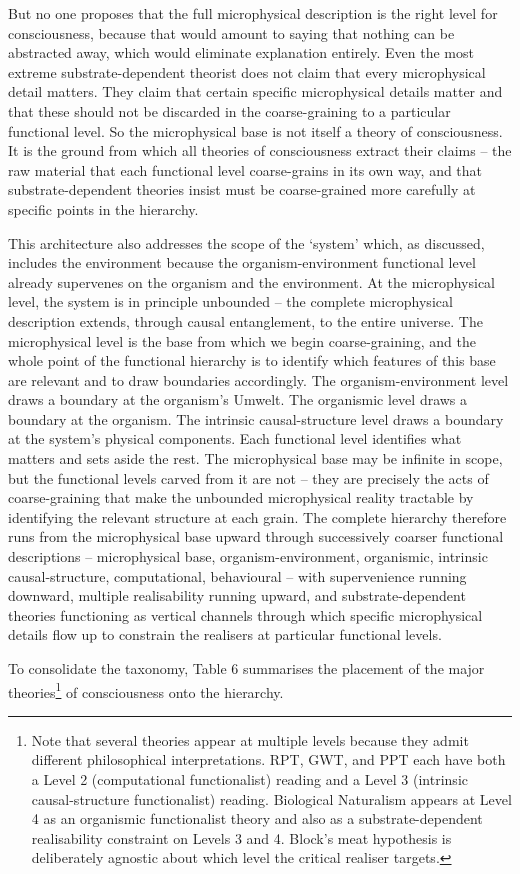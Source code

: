 \documentclass[11pt, a4paper, onecolumn, gdm]{google}
\begin{document}
But no one proposes that the full microphysical description is the right level for consciousness, because that would amount to saying that nothing can be abstracted away, which would eliminate explanation entirely.
Even the most extreme substrate-dependent theorist does not claim that every microphysical detail matters.
They claim that certain specific microphysical details matter and that these should not be discarded in the coarse-graining to a particular functional level.
So the microphysical base is not itself a theory of consciousness.
It is the ground from which all theories of consciousness extract their claims -- the raw material that each functional level coarse-grains in its own way, and that substrate-dependent theories insist must be coarse-grained more carefully at specific points in the hierarchy.

This architecture also addresses the scope of the `system' which, as discussed, includes the environment because the organism-environment functional level already supervenes on the organism and the environment.
At the microphysical level, the system is in principle unbounded -- the complete microphysical description extends, through causal entanglement, to the entire universe.
The microphysical level is the base from which we begin coarse-graining, and the whole point of the functional hierarchy is to identify which features of this base are relevant and to draw boundaries accordingly.
The organism-environment level draws a boundary at the organism's Umwelt.
The organismic level draws a boundary at the organism.
The intrinsic causal-structure level draws a boundary at the system's physical components.
Each functional level identifies what matters and sets aside the rest.
The microphysical base may be infinite in scope, but the functional levels carved from it are not -- they are precisely the acts of coarse-graining that make the unbounded microphysical reality tractable by identifying the relevant structure at each grain.
The complete hierarchy therefore runs from the microphysical base upward through successively coarser functional descriptions -- microphysical base, organism-environment, organismic, intrinsic causal-structure, computational, behavioural -- with supervenience running downward, multiple realisability running upward, and substrate-dependent theories functioning as vertical channels through which specific microphysical details flow up to constrain the realisers at particular functional levels.

To consolidate the taxonomy, Table 6 summarises the placement of the major theories\footnote{Note that several theories appear at multiple levels because they admit different philosophical interpretations. RPT, GWT, and PPT each have both a Level 2 (computational functionalist) reading and a Level 3 (intrinsic causal-structure functionalist) reading. Biological Naturalism appears at Level 4 as an organismic functionalist theory and also as a substrate-dependent realisability constraint on Levels 3 and 4. Block's meat hypothesis is deliberately agnostic about which level the critical realiser targets.} of consciousness onto the hierarchy.
\end{document}
